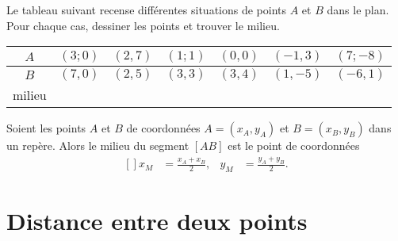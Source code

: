 \begin{example}
    Le tableau suivant recense différentes situations de points \( A\) et \( B\) dans le plan. Pour chaque cas, dessiner les points et trouver le milieu.

    \begin{center}
        \begin{tabular}[h]{|c||c|c|c|c|c|c|}
            \hline
            \( A\)&\( (3;0)\)&\( (2,7)\)&\( (1;1)\)&\( (0,0)\)&\( (-1,3)\)&\( (7;-8)\)\\
            \hline
            \( B\)&\( (7,0)\)&\( (2,5)\)&\( (3,3)\)&\( (3,4)\)&\( (1,-5)\)&\( (-6,1)\)\\
            \hline\hline
            milieu&&&&&\\
            \hline
        \end{tabular}
    \end{center}
\end{example}

\begin{Aretenir}
    Soient les points \( A\) et \( B\) de coordonnées \( A=(x_A,y_A)\) et \( B=(x_B,y_B)\) dans un repère. Alors le milieu du segment \( [AB]\) est le point de coordonnées
    \begin{equation}
        \begin{aligned}[]
            x_M&=\frac{ x_A+x_B }{ 2 },&y_M&=\frac{ y_A+y_B }{2}.
        \end{aligned}
    \end{equation}
\end{Aretenir}

\section{Distance entre deux points}

